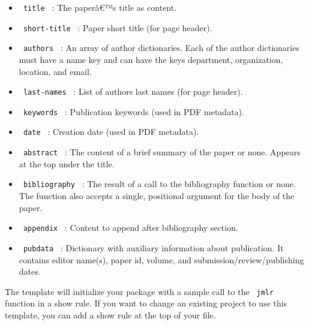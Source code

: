 \begin{itemize}
\tightlist
\item
  \texttt{\ title\ } : The paperâ€™s title as content.
\item
  \texttt{\ short-title\ } : Paper short title (for page header).
\item
  \texttt{\ authors\ } : An array of author dictionaries. Each of the
  author dictionaries must have a name key and can have the keys
  department, organization, location, and email.
\item
  \texttt{\ last-names\ } : List of authors last names (for page
  header).
\item
  \texttt{\ keywords\ } : Publication keywords (used in PDF metadata).
\item
  \texttt{\ date\ } : Creation date (used in PDF metadata).
\item
  \texttt{\ abstract\ } : The content of a brief summary of the paper or
  none. Appears at the top under the title.
\item
  \texttt{\ bibliography\ } : The result of a call to the bibliography
  function or none. The function also accepts a single, positional
  argument for the body of the paper.
\item
  \texttt{\ appendix\ } : Content to append after bibliography section.
\item
  \texttt{\ pubdata\ } : Dictionary with auxiliary information about
  publication. It contains editor name(s), paper id, volume, and
  submission/review/publishing dates.
\end{itemize}

The template will initialize your package with a sample call to the
\texttt{\ jmlr\ } function in a show rule. If you want to change an
existing project to use this template, you can add a show rule at the
top of your file.

\begin{Shaded}
\begin{Highlighting}[]
\NormalTok{  ),}
\NormalTok{)}
\end{Highlighting}
\end{Shaded}

